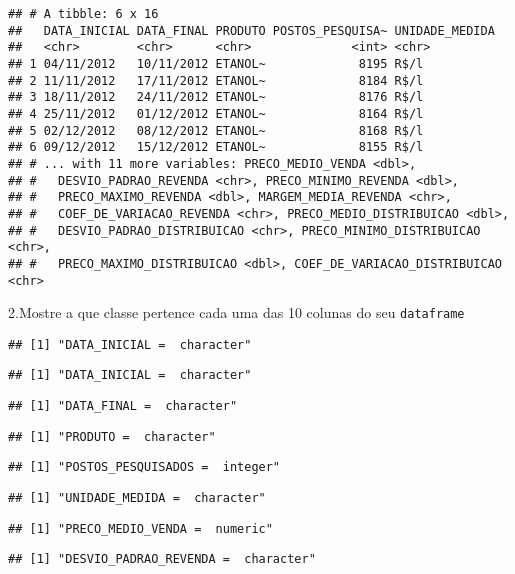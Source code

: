 \documentclass[]{article}
\begin{document}
\begin{verbatim}
## # A tibble: 6 x 16
##   DATA_INICIAL DATA_FINAL PRODUTO POSTOS_PESQUISA~ UNIDADE_MEDIDA
##   <chr>        <chr>      <chr>              <int> <chr>         
## 1 04/11/2012   10/11/2012 ETANOL~             8195 R$/l          
## 2 11/11/2012   17/11/2012 ETANOL~             8184 R$/l          
## 3 18/11/2012   24/11/2012 ETANOL~             8176 R$/l          
## 4 25/11/2012   01/12/2012 ETANOL~             8164 R$/l          
## 5 02/12/2012   08/12/2012 ETANOL~             8168 R$/l          
## 6 09/12/2012   15/12/2012 ETANOL~             8155 R$/l          
## # ... with 11 more variables: PRECO_MEDIO_VENDA <dbl>,
## #   DESVIO_PADRAO_REVENDA <chr>, PRECO_MINIMO_REVENDA <dbl>,
## #   PRECO_MAXIMO_REVENDA <dbl>, MARGEM_MEDIA_REVENDA <chr>,
## #   COEF_DE_VARIACAO_REVENDA <chr>, PRECO_MEDIO_DISTRIBUICAO <dbl>,
## #   DESVIO_PADRAO_DISTRIBUICAO <chr>, PRECO_MINIMO_DISTRIBUICAO <chr>,
## #   PRECO_MAXIMO_DISTRIBUICAO <dbl>, COEF_DE_VARIACAO_DISTRIBUICAO <chr>
\end{verbatim}

2.Mostre a que classe pertence cada uma das 10 colunas do seu
\texttt{dataframe}

\begin{verbatim}
## [1] "DATA_INICIAL =  character"
\end{verbatim}

\begin{verbatim}
## [1] "DATA_INICIAL =  character"
\end{verbatim}

\begin{verbatim}
## [1] "DATA_FINAL =  character"
\end{verbatim}

\begin{verbatim}
## [1] "PRODUTO =  character"
\end{verbatim}

\begin{verbatim}
## [1] "POSTOS_PESQUISADOS =  integer"
\end{verbatim}

\begin{verbatim}
## [1] "UNIDADE_MEDIDA =  character"
\end{verbatim}

\begin{verbatim}
## [1] "PRECO_MEDIO_VENDA =  numeric"
\end{verbatim}

\begin{verbatim}
## [1] "DESVIO_PADRAO_REVENDA =  character"
\end{verbatim}
\end{document}
